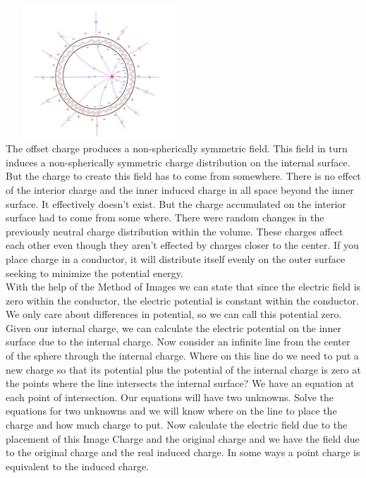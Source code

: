\documentclass[fleqn]{article}
\begin{document}
\begin{enumerate}
      \textcolor{hwColor}{
        \\
        \includegraphics[height=5cm, width=7cm]{Seven.JPG}
        \\
        The offset charge produces a non-spherically symmetric field. This field in turn induces a non-spherically symmetric charge distribution 
        on the internal surface. But the charge to create this field has to come from somewhere. There is no effect of the interior charge 
        and the inner induced charge in all space beyond the inner surface. It effectively doesn't exist. But the charge accumulated on 
        the interior surface had to come from some where. There were random changes in the previously neutral charge distribution within 
        the volume. These charges affect each other even though they aren't effected by charges closer to the center. If you place charge
        in a conductor, it will distribute itself evenly on the outer surface seeking to minimize the potential energy.
        \\
        With the help of the Method of Images we can state that since the electric field is zero within the conductor, the electric potential is constant within
        the conductor. We only care about differences in potential, so we can call this potential zero. Given our internal charge, we can calculate 
        the electric potential on the inner surface due to the internal charge. Now consider an infinite line from the center of the sphere 
        through the internal charge. Where on this line do we need to put a new charge so that its potential plus the potential of the internal 
        charge is zero at the points where the line intersects the internal surface? We have an equation at each point of intersection. Our 
        equations will have two unknowns. Solve the equations for two unknowns and we will know where on the line to place the charge and how much
        charge to put. Now calculate the electric field due to the placement of this Image Charge and the original charge and we have the field 
        due to the original charge and the real induced charge. In some ways a point charge is equivalent to the induced charge.
}
\end{enumerate}
\end{document}

